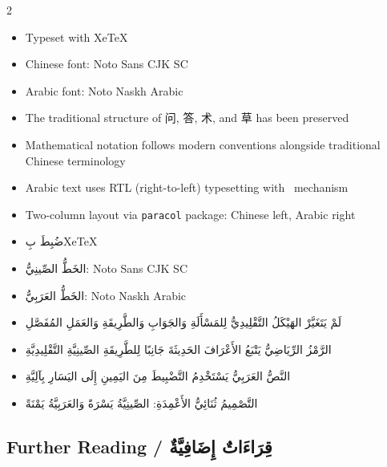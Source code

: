 \documentclass[11pt,a4paper]{article}
\newcommand{\ar}[1]{\arabicfont\beginR #1\endR}
\newcommand{\zhtext}[1]{{\chinese #1}}
\newenvironment{bilingual}{%
  \begin{paracol}{2}
}{%
  \end{paracol}
}
\begin{document}
\begin{bilingual}

\begin{leftcolumn*}
\begin{itemize}
  \item Typeset with XeTeX
  \item Chinese font: Noto Sans CJK SC
  \item Arabic font: Noto Naskh Arabic
  \item The traditional structure of \zhtext{问}, \zhtext{答}, \zhtext{术}, and \zhtext{草} has been preserved
  \item Mathematical notation follows modern conventions alongside traditional Chinese terminology
  \item Arabic text uses RTL (right-to-left) typesetting with \TeXXeT\ mechanism
  \item Two-column layout via \texttt{paracol} package: Chinese left, Arabic right
\end{itemize}
\end{leftcolumn*}

\begin{rightcolumn*}
\begin{itemize}
  \item \ar{ضُبِطَ بِXeTeX}
  \item \ar{الخَطُّ الصِّينِيُّ: Noto Sans CJK SC}
  \item \ar{الخَطُّ العَرَبِيُّ: Noto Naskh Arabic}
  \item \ar{لَمْ يَتَغَيَّرْ الهَيْكَلُ التَّقْلِيدِيُّ لِلمَسْأَلَةِ وَالجَوَابِ وَالطَّرِيقَةِ وَالعَمَلِ المُفَصَّلِ}
  \item \ar{الرَّمْزُ الرِّيَاضِيُّ يَتْبَعُ الأَعْرَافَ الحَدِيثَةَ جَانِبًا لِلطَّرِيقَةِ الصِّينِيَّةِ التَّقْلِيدِيَّةِ}
  \item \ar{النَّصُّ العَرَبِيُّ يَسْتَخْدِمُ التَّضْبِيطَ مِنَ اليَمِينِ إِلَى اليَسَارِ بِآلِيَّةِ \TeXXeT}
  \item \ar{التَّصْمِيمُ ثُنَائِيُّ الأَعْمِدَةِ: الصِّينِيَّةُ يَسْرَةً وَالعَرَبِيَّةُ يَمْنَةً}
\end{itemize}
\end{rightcolumn*}

\end{bilingual}

\vspace{1em}

\subsection*{Further Reading / \ar{قِرَاءَاتٌ إِضَافِيَّةٌ}}
\end{document}
